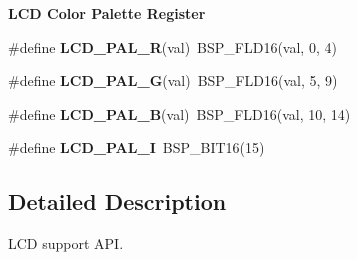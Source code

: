\begin{Indent}\textbf{ L\+CD Color Palette Register}\par
\begin{DoxyCompactItemize}
\item 
\#define {\bfseries L\+C\+D\+\_\+\+P\+A\+L\+\_\+R}(val)~B\+S\+P\+\_\+\+F\+L\+D16(val, 0, 4)
\item 
\#define {\bfseries L\+C\+D\+\_\+\+P\+A\+L\+\_\+G}(val)~B\+S\+P\+\_\+\+F\+L\+D16(val, 5, 9)
\item 
\#define {\bfseries L\+C\+D\+\_\+\+P\+A\+L\+\_\+B}(val)~B\+S\+P\+\_\+\+F\+L\+D16(val, 10, 14)
\item 
\#define {\bfseries L\+C\+D\+\_\+\+P\+A\+L\+\_\+I}~B\+S\+P\+\_\+\+B\+I\+T16(15)
\end{DoxyCompactItemize}
\end{Indent}


\subsection{Detailed Description}
L\+CD support A\+PI. 

